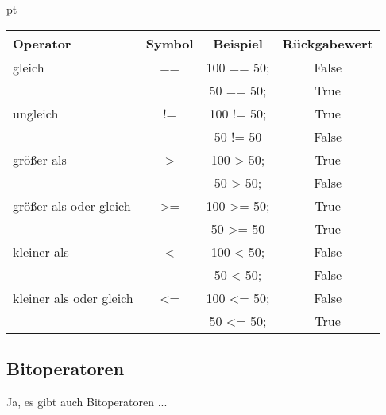 \begin{frame}
    \slidehead

    \begin{center}
         pt
        \begingroup
        \fontsize{10pt}{11pt}\selectfont
        \begin{tabular}{|l|c|c|c|}
            \hline
            \textbf{Operator}       & \textbf{Symbol} & \textbf{Beispiel} & \textbf{Rückgabewert} \\ \hline
            gleich                  & ==              & 100 == 50;        & False                 \\
                                    &                 & 50 == 50;         & True                  \\ \hline
            ungleich                & !=              & 100 != 50;        & True                  \\
                                    &                 & 50 != 50          & False                 \\ \hline
            größer als              & >               & 100 > 50;         & True                  \\
                                    &                 & 50 > 50;          & False                 \\ \hline
            größer als oder gleich  & >=              & 100 >= 50;        & True                  \\
                                    &                 & 50 >= 50          & True                  \\ \hline
            kleiner als             & <               & 100 < 50;         & False                 \\
                                    &                 & 50 < 50;          & False                 \\ \hline
            kleiner als oder gleich & <=              & 100 <= 50;        & False                 \\
                                    &                 & 50 <= 50;         & True                  \\ \hline
        \end{tabular}
        \endgroup
    \end{center}

\end{frame}

\subsection{Bitoperatoren}
\begin{frame}
    \slidehead
    Ja, es gibt auch Bitoperatoren ...
\end{frame}

